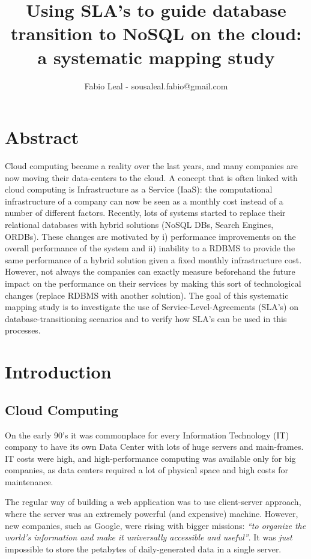 \documentclass{article}
\begin{document}
\title{Using SLA’s to guide database transition to NoSQL on the cloud: a systematic mapping study}
\author{Fabio Leal - sousaleal.fabio@gmail.com}
\maketitle  


\section{Abstract}
Cloud computing became a reality over the last years, and many companies are now moving their data-centers to the cloud. A concept that is often linked with cloud computing is Infrastructure as a Service (IaaS): the computational infrastructure of a company can now be seen as a monthly cost instead of a number of different factors. Recently, lots of systems started to replace their relational databases with hybrid solutions (NoSQL DBs, Search Engines, ORDBs). These changes are motivated by i) performance improvements on the overall performance of the system and ii) inability to a RDBMS to provide the same performance of a hybrid solution given a fixed monthly infrastructure cost. However, not always the companies can exactly measure beforehand the future impact on the performance on their services by making this sort of technological changes (replace RDBMS with another solution). The goal of this systematic mapping study is to investigate the use of Service-Level-Agreements (SLA’s) on database-transitioning scenarios and to verify how SLA’s can be used in this processes.

\section{Introduction}
\subsection{Cloud Computing}
On the early 90's it was commonplace for every Information Technology (IT) company to have its own Data Center with lots of huge servers and main-frames. IT costs were high, and high-performance computing was available only for big companies, as data centers required a lot of physical space and high costs for maintenance. 

The regular way of building a web application was to use client-server approach, where the server was an extremely powerful (and expensive) machine. However, new companies, such as Google, were rising with bigger missions: \textit{``to organize the world's information and make it universally accessible and useful''}. It was \textit{just} impossible to store the petabytes of daily-generated data in a single server. 
\end{document}

